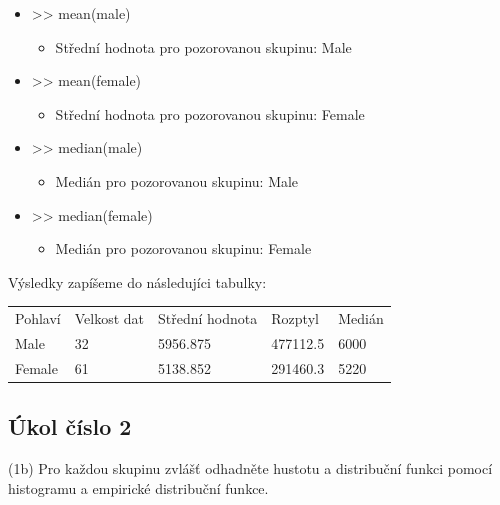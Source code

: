 \documentclass[paper=a4, fontsize=12pt]{scrartcl}
\numberwithin{equation}{section}		%
\numberwithin{figure}{section}			%
\numberwithin{table}{section}				%
\begin{document}
\begin{itemize}
\begin{itemize}
		\end{itemize}
	\item >> mean(male)
		\begin{itemize}
		\item Střední hodnota pro pozorovanou skupinu: Male
		\end{itemize}
	\item >> mean(female)
		\begin{itemize}
		\item Střední hodnota pro pozorovanou skupinu: Female
		\end{itemize}
	\item >> median(male)
		\begin{itemize}
		\item Medián pro pozorovanou skupinu: Male
		\end{itemize}
	\item >> median(female)
		\begin{itemize}
		\item Medián pro pozorovanou skupinu: Female
		\end{itemize}
\end{itemize}
Výsledky zapíšeme do následujíci tabulky:\\
\begin{table}[htb]
\begin{tabular}{lllll}
\rowcolor[HTML]{EFEFEF}
Pohlaví & Velkost dat & Střední hodnota & Rozptyl & Medián \\
\cellcolor[HTML]{EFEFEF}Male     &     32       &         5956.875        &   477112.5      &   6000     \\
\cellcolor[HTML]{EFEFEF}Female   &      61       &         5138.852        &    291460.3     &   5220    
\end{tabular}
\end{table}

\subsection{Úkol číslo 2}
(1b) Pro každou skupinu zvlášť odhadněte hustotu a distribuční funkci pomocí histogramu a empirické distribuční funkce.
\end{document}
